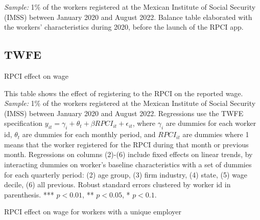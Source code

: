 \documentclass[oneside,11pt]{article}
\begin{document}
\scriptsize{
\noindent \textit{Sample:} 1\% of the workers registered at the Mexican Institute of Social Security (IMSS) between January 2020 and August 2022. Balance table elaborated with the workers' characteristics during 2020, before the launch of the RPCI app.
}

\clearpage

\subsection{TWFE}

\begin{table}[H]
    \caption{RPCI effect on wage}
    \label{twfe_wage}
    \begin{center}
    \scriptsize{}
    \end{center}
\end{table}

\scriptsize{
\noindent This table shows the effect of registering to the RPCI on the reported wage. \textit{Sample:} 1\% of the workers registered at the Mexican Institute of Social Security (IMSS) between January 2020 and August 2022. Regressions use the TWFE specification $y_{it} = \gamma_{i} + \theta_{t}+ \beta RPCI_{it} +\epsilon_{it}$, where $\gamma_{i}$ are dummies for each worker id, $\theta_{t}$ are dummies for each monthly period, and $RPCI_{it}$ are dummies where 1 means that the worker registered for the RPCI during that month or previous month. Regressions on columns (2)-(6) include fixed effects on linear trends, by interacting dummies on worker's baseline characteristics with a set of dummies for each quarterly period: (2) age group, (3) firm industry, (4) state, (5) wage decile, (6) all previous. Robust standard errors clustered by worker id in parenthesis. *** $p<0.01$, ** $p<0.05$, * $p<0.1$.
}

\clearpage

\begin{table}[H]
    \caption{RPCI effect on wage for workers with a unique employer}
    \label{twfe_wage_same_idrfc}
    \begin{center}
    \scriptsize{}
    \end{center}
\end{table}
\end{document}
